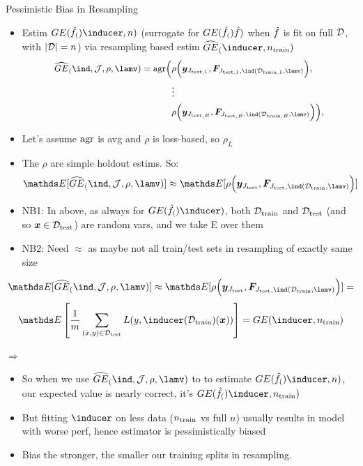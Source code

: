 \begin{vbframe}{Pessimistic Bias in Resampling}
\begin{itemize}
    \item Estim $\GE(\inducer, n)$ (surrogate for $GE(\hat{f}_{(})\hat{f})$ when $\hat{f}$ is fit on full $\mathcal{D}$, with $|\mathcal{D}|=n$) via resampling based estim
        $\GEh(\inducer, \ntrain)$
\begin{equation*}
\small
\begin{split}
\GEhresa = \agr\Big(
 &\rho\Big(\yv_{\Jtesti[1]}, \FJtestftraini[1]\Big), \\ &\large{\vdots} \\
& \rho\Big(\yv_{\Jtesti[B]}, \FJtestftraini[B]\Big)
    \Big),
\end{split}
\end{equation*}
\item Let's assume $\mathrm{agr}$ is avg and $\rho$ is loss-based, so $\rho_L$ 
\item The $\rho$ are simple holdout estims. So:
$$\E[\GEhresa] \approx \E[\rho\Big(\yv_{\Jtest}, \FJtestftrain\Big)] $$
\end{itemize}

\begin{itemize}
    \footnotesize
\item NB1: In above, as always for $\GE(\inducer)$, both $\mathcal{D}_{\text{train}}$ and $\mathcal{D}_{\text{test}}$ (and so $\bm{x} \in \mathcal{D}_{\text{test}}$) are random vars, and we take E over them 
\item NB2: Need $\approx$ as maybe not all train/test sets in resampling of exactly same size
\end{itemize}

\framebreak


\framebreak

$$\E[\GEhresa] \approx \E[\rho\Big(\yv_{\Jtest}, \FJtestftrain\Big)] = $$
$$  \E \left[ \frac{1}{m} \sum_{\xy \in \Dtest} L(y, \inducer(\Dtrain)(\xv)) \right] = GE(\inducer, \ntrain)$$



$\Rightarrow$

\begin{itemize}
    \item So when we use $\GEhresa$ to to estimate $\GE(\inducer, n)$, our expected value is nearly correct, it's $\GE(\inducer, \ntrain)$
    \item But fitting $\inducer$ on less data ($n_{\mathrm{train}}$ vs full $n$) usually results in model with worse perf, hence estimator is pessimistically biased 
    \item Bias the stronger, the smaller our training splits in resampling.
\end{itemize}
\end{vbframe}

